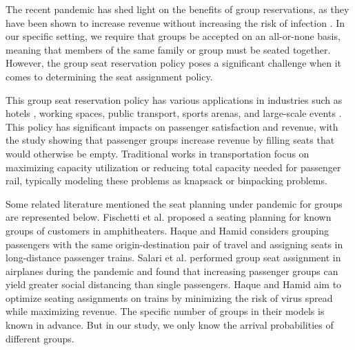 
The recent pandemic has shed light on the benefits of group reservations, as they have been shown to increase revenue without increasing the risk of infection \cite{moore2021seat}. In our specific setting, we require that groups be accepted on an all-or-none basis, meaning that members of the same family or group must be seated together. However, the group seat reservation policy poses a significant challenge when it comes to determining the seat assignment policy.


This group seat reservation policy has various applications in industries such as hotels \cite{li2013modeling}, working spaces\cite{fischetti2021safe}, public transport\cite{deplano2019offline}, sports arenas\cite{kwag2022optimal}, and large-scale events \cite{lewis2016creating}. This policy has significant impacts on passenger satisfaction and revenue, with the study \cite{yuen2002group} showing that passenger groups increase revenue by filling seats that would otherwise be empty. Traditional works \cite{clausen2010off, deplano2019offline}in transportation focus on maximizing capacity utilization or reducing total capacity needed for passenger rail, typically modeling these problems as knapsack or binpacking problems.

Some related literature mentioned the seat planning under pandemic for groups are represented below.
Fischetti et al. \cite{fischetti2021safe} proposed a seating planning for known groups of customers in amphitheaters. Haque and Hamid \cite{haque2022optimization} considers grouping passengers with the same origin-destination pair of travel and assigning seats in long-distance passenger trains. Salari et al. \cite{salari2022social} performed group seat assignment in airplanes during the pandemic and found that increasing passenger groups can yield greater social distancing than single passengers. Haque and Hamid \cite{haque2023social} aim to optimize seating assignments on trains by minimizing the risk of virus spread while maximizing revenue. The specific number of groups in their models is known in advance. But in our study, we only know the arrival probabilities of different groups.


